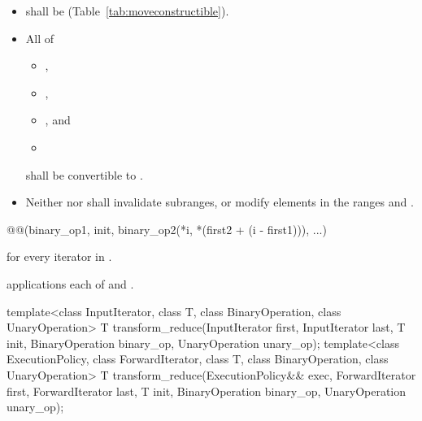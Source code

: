 \begin{itemdescr}
\pnum
\requires
\begin{itemize}
\item {} shall be  (Table~\ref{tab:moveconstructible}).
\item All of
\begin{itemize}
\item {},
\item {},
\item {}, and
\item {}
\end{itemize}
shall be convertible to .
\item Neither  nor  shall invalidate
subranges, or modify elements in the ranges  and
.
\end{itemize}

\pnum
\returns
\begin{codeblock}
@@(binary_op1, init, binary_op2(*i, *(first2 + (i - first1))), ...)
\end{codeblock}
for every iterator  in .

\pnum
\complexity {} applications each of  and
.
\end{itemdescr}

%
\begin{itemdecl}
template<class InputIterator, class T,
         class BinaryOperation, class UnaryOperation>
  T transform_reduce(InputIterator first, InputIterator last, T init,
                     BinaryOperation binary_op, UnaryOperation unary_op);
template<class ExecutionPolicy,
         class ForwardIterator, class T,
         class BinaryOperation, class UnaryOperation>
  T transform_reduce(ExecutionPolicy&& exec,
                     ForwardIterator first, ForwardIterator last,
                     T init, BinaryOperation binary_op, UnaryOperation unary_op);
\end{itemdecl}

